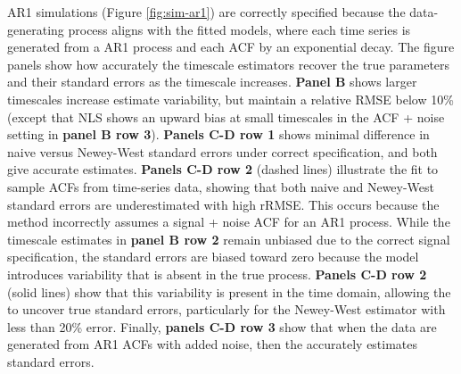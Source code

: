 \documentclass[latex/main.tex]{subfiles}
\begin{document}
AR1 simulations (Figure \ref{fig:sim-ar1}) are correctly specified because the data-generating process aligns with the fitted models, where each time series is generated from a AR1 process and each ACF by an exponential decay. The figure panels show how accurately the timescale estimators recover the true parameters and their standard errors as the timescale increases. \textbf{Panel B} shows larger timescales increase estimate variability, but maintain a relative RMSE below 10\% (except that NLS shows an upward bias at small timescales in the ACF + noise setting in \textbf{panel B row 3}). \textbf{Panels C-D row 1} shows minimal difference in naive versus Newey-West standard errors under correct specification, and both give accurate estimates. \textbf{Panels C-D row 2} (dashed lines) illustrate the  fit to sample ACFs from time-series data, showing that both naive and Newey-West standard errors are underestimated with high rRMSE. This occurs because the method incorrectly assumes a signal + noise ACF for an AR1 process. While the timescale estimates in \textbf{panel B row 2} remain unbiased due to the correct signal specification, the standard errors are biased toward zero because the model introduces variability that is absent in the true process. \textbf{Panels C-D row 2} (solid lines) show that this variability is present in the time domain, allowing the  to uncover true standard errors, particularly for the Newey-West estimator with less than 20\% error. Finally, \textbf{panels C-D row 3} show that when the data are generated from AR1 ACFs with added noise, then the  accurately estimates standard errors.\\
\end{document}
